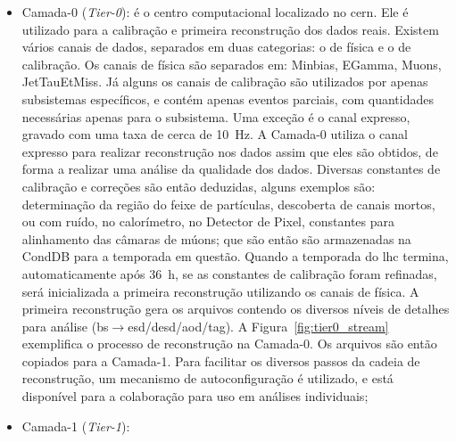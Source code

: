 \begin{itemize}
\item Camada-0 (\emph{Tier-0}): %
é o centro computacional localizado no \gls{cern}. Ele é utilizado para a
calibração e primeira reconstrução dos dados reais. Existem vários canais de dados, 
separados em duas categorias: o de física e o de calibração. Os canais de física são separados em:
Minbias, EGamma, Muons, JetTauEtMiss. Já alguns os canais de calibração são
utilizados por apenas subsistemas específicos, e contém apenas eventos parciais,
com quantidades necessárias apenas para o subsistema. Uma exceção é o canal 
expresso, gravado com uma taxa de cerca de 10~Hz. A Camada-0 utiliza o canal
expresso para realizar reconstrução nos dados assim que eles são obtidos, de
forma a realizar uma análise da qualidade dos dados.
Diversas constantes de calibração e correções são então deduzidas, 
alguns exemplos são: determinação da região do 
feixe de partículas, descoberta de canais mortos, ou com ruído,
no calorímetro, no Detector de Pixel, constantes para alinhamento das câmaras de
múons; que são então são armazenadas na CondDB para a temporada em questão. 
Quando a temporada do \gls{lhc} termina, automaticamente após 36~h, se as
constantes de calibração foram refinadas, será inicializada a primeira 
reconstrução utilizando os canais de física. 
A primeira reconstrução gera os arquivos contendo os diversos níveis de 
detalhes para análise
(\gls{bs}$\rightarrow$\gls{esd}/\gls{desd}/\gls{aod}/\gls{tag}). A
Figura~\ref{fig:tier0_stream} exemplifica o processo de reconstrução na
Camada-0. Os arquivos são então copiados para a Camada-1.
Para facilitar os diversos passos da cadeia de reconstrução, 
um mecanismo de autoconfiguração \cite{recotrf} é utilizado, 
e está disponível para a colaboração para uso em análises individuais;
\item Camada-1 (\emph{Tier-1}): %

\end{itemize}
